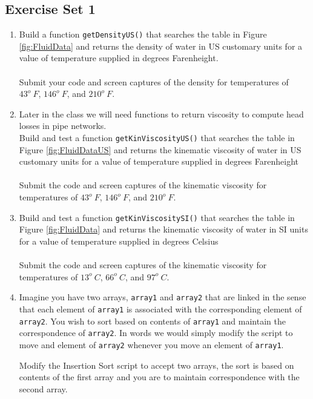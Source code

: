 \subsection*{Exercise Set 1}
\begin{enumerate}
\item Build a function \texttt{getDensityUS()} that searches the table in Figure \ref{fig:FluidData} and returns the density of water in US customary units for a value of temperature supplied in degrees Farenheight. \\~\\
Submit your code and screen captures of the density for temperatures of $43^o~F$, $146^o~F$, and $210^o~F$.

\item Later in the class we will need functions to return viscosity to compute head losses in pipe networks.  \\
Build and test a function \texttt{getKinViscosityUS()} that searches the table in Figure \ref{fig:FluidDataUS} and returns the kinematic viscosity of water in US customary units for a value of temperature supplied in degrees Farenheight\\~\\
Submit the code and screen captures of the kinematic viscosity for temperatures of $43^o~F$, $146^o~F$, and $210^o~F$. 

\item Build and test a function \texttt{getKinViscositySI()} that searches the table in Figure \ref{fig:FluidData} and returns the kinematic viscosity of water in SI units for a value of temperature supplied in degrees Celsius \\~\\
Submit the code and screen captures of the kinematic viscosity for temperatures of $13^o~C$, $66^o~C$, and $97^o~C$.

\item Imagine you have two arrays, \texttt{array1} and \texttt{array2} that are linked in the sense that each element of \texttt{array1} is associated with the corresponding element of \texttt{array2}.  You wish to sort based on contents of \texttt{array1} and maintain the correspondence of \texttt{array2}.  In words we would simply modify the script to move and element of \texttt{array2} whenever you move an element of \texttt{array1}.

Modify the Insertion Sort script to accept two arrays, the sort is based on contents of the first array and you are to maintain correspondence with the second array.


\end{enumerate}
